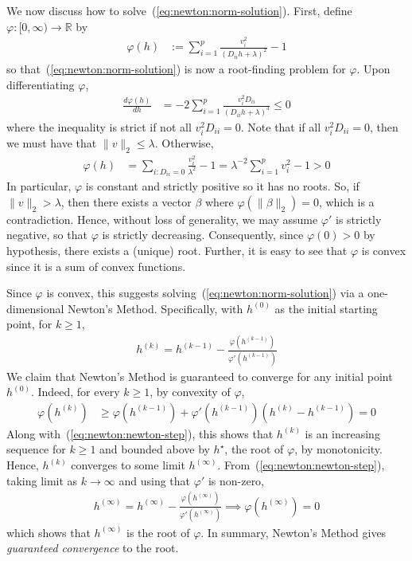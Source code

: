 \documentclass[fontsize=11pt]{article}
\newcommand{\R}{\mathbb{R}}
\newcommand{\norm}[1]{\|#1\|}
\begin{document}
We now discuss how to solve~(\ref{eq:newton:norm-solution}).
First, define $\varphi : [0, \infty) \to \R$ by
\begin{align*}
    \varphi(h)
    &:=
    \sum\limits_{i=1}^p
    \frac{v_i^2}{(D_{ii} h + \lambda)^2}
    - 1
\end{align*}
so that~(\ref{eq:newton:norm-solution}) is now a root-finding problem for $\varphi$.
Upon differentiating $\varphi$,
\begin{align*}
    \frac{d\varphi(h)}{dh}
    &=
    -2 \sum\limits_{i=1}^p
    \frac{v_i^2 D_{ii}}{(D_{ii} h + \lambda)^3}
    \leq
    0
\end{align*}
where the inequality is strict if not all $v_i^2 D_{ii} = 0$.
Note that if all $v_i^2 D_{ii} = 0$, then we must have that $\norm{v}_2 \leq \lambda$.
Otherwise,
\begin{align*}
    \varphi(h)
    &=
    \sum\limits_{i : D_{ii} = 0}
    \frac{v_i^2}{\lambda^2}
    - 1
    =
    \lambda^{-2} \sum\limits_{i=1}^p v_i^2 - 1
    > 0
\end{align*}
In particular, $\varphi$ is constant and strictly positive so it has no roots.
So, if $\norm{v}_2 > \lambda$, then there exists a vector $\beta$
where $\varphi(\norm{\beta}_2) = 0$, which is a contradiction.
Hence, without loss of generality, we may assume $\varphi'$ is strictly negative,
so that $\varphi$ is strictly decreasing.
Consequently, since $\varphi(0) > 0$ by hypothesis, there exists a (unique) root.
Further, it is easy to see that $\varphi$ is convex since it is a 
sum of convex functions.

Since $\varphi$ is convex, this suggests solving~(\ref{eq:newton:norm-solution})
via a one-dimensional Newton's Method.
Specifically, with $h^{(0)}$ as the initial starting point, for $k\geq 1$,
\begin{align}
    h^{(k)} = h^{(k-1)} - \frac{\varphi(h^{(k-1)})}{\varphi'(h^{(k-1)})}
    \label{eq:newton:newton-step}
\end{align}
We claim that Newton's Method is guaranteed to converge for any initial point $h^{(0)}$.
Indeed, for every $k\geq 1$, by convexity of $\varphi$,
\begin{align*}
    \varphi(h^{(k)})
    &\geq
    \varphi(h^{(k-1)})
    + \varphi'(h^{(k-1)}) (h^{(k)} - h^{(k-1)})
    =
    0
\end{align*}
Along with~(\ref{eq:newton:newton-step}),
this shows that $h^{(k)}$ is an increasing sequence for $k\geq 1$ 
and bounded above by $h^\star$, the root of $\varphi$, by monotonicity.
Hence, $h^{(k)}$ converges to some limit $h^{(\infty)}$. 
From~(\ref{eq:newton:newton-step}), taking limit as $k\to \infty$ and using that $\varphi'$ is non-zero,
\begin{align*}
    h^{(\infty)} = h^{(\infty)} - \frac{\varphi(h^{(\infty)})}{\varphi'(h^{(\infty)})}
    \implies
    \varphi(h^{(\infty)}) = 0
\end{align*}
which shows that $h^{(\infty)}$ is the root of $\varphi$.
In summary, Newton's Method gives \emph{guaranteed convergence} to the root.
\end{document}
